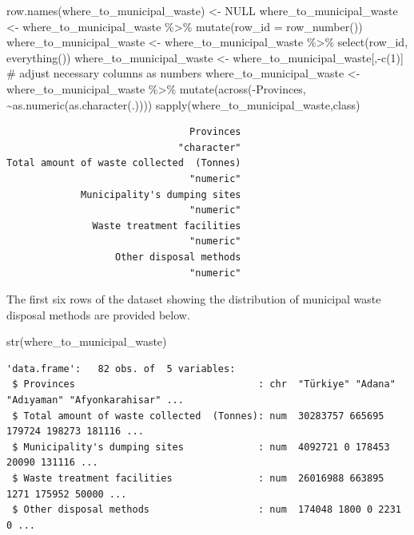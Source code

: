 \documentclass[
  11pt,
  a4paper,
  DIV=11,
  numbers=noendperiod]{scrartcl}
\newenvironment{Shaded}{\begin{snugshade}}{\end{snugshade}}
\newcommand{\AttributeTok}[1]{\textcolor[rgb]{0.40,0.45,0.13}{#1}}
\newcommand{\CommentTok}[1]{\textcolor[rgb]{0.37,0.37,0.37}{#1}}
\newcommand{\ConstantTok}[1]{\textcolor[rgb]{0.56,0.35,0.01}{#1}}
\newcommand{\DecValTok}[1]{\textcolor[rgb]{0.68,0.00,0.00}{#1}}
\newcommand{\FunctionTok}[1]{\textcolor[rgb]{0.28,0.35,0.67}{#1}}
\newcommand{\NormalTok}[1]{\textcolor[rgb]{0.00,0.23,0.31}{#1}}
\newcommand{\OtherTok}[1]{\textcolor[rgb]{0.00,0.23,0.31}{#1}}
\newcommand{\SpecialCharTok}[1]{\textcolor[rgb]{0.37,0.37,0.37}{#1}}
\begin{document}
\begin{Shaded}
\begin{Highlighting}[]
\FunctionTok{row.names}\NormalTok{(where\_to\_municipal\_waste) }\OtherTok{\textless{}{-}} \ConstantTok{NULL}
\NormalTok{where\_to\_municipal\_waste }\OtherTok{\textless{}{-}}\NormalTok{ where\_to\_municipal\_waste }\SpecialCharTok{\%\textgreater{}\%}
  \FunctionTok{mutate}\NormalTok{(}\AttributeTok{row\_id =} \FunctionTok{row\_number}\NormalTok{())  }
\NormalTok{where\_to\_municipal\_waste }\OtherTok{\textless{}{-}}\NormalTok{ where\_to\_municipal\_waste }\SpecialCharTok{\%\textgreater{}\%}
  \FunctionTok{select}\NormalTok{(row\_id, }\FunctionTok{everything}\NormalTok{()) }
\NormalTok{where\_to\_municipal\_waste }\OtherTok{\textless{}{-}}\NormalTok{ where\_to\_municipal\_waste[,}\SpecialCharTok{{-}}\FunctionTok{c}\NormalTok{(}\DecValTok{1}\NormalTok{)]}
\CommentTok{\# adjust necessary columns as numbers}
\NormalTok{where\_to\_municipal\_waste }\OtherTok{\textless{}{-}}\NormalTok{ where\_to\_municipal\_waste }\SpecialCharTok{\%\textgreater{}\%}
  \FunctionTok{mutate}\NormalTok{(}\FunctionTok{across}\NormalTok{(}\SpecialCharTok{{-}}\NormalTok{Provinces, }\SpecialCharTok{\textasciitilde{}}\FunctionTok{as.numeric}\NormalTok{(}\FunctionTok{as.character}\NormalTok{(.))))}
\FunctionTok{sapply}\NormalTok{(where\_to\_municipal\_waste,class)}
\end{Highlighting}
\end{Shaded}

\begin{verbatim}
                                Provinces 
                              "character" 
Total amount of waste collected  (Tonnes) 
                                "numeric" 
             Municipality's dumping sites 
                                "numeric" 
               Waste treatment facilities 
                                "numeric" 
                   Other disposal methods 
                                "numeric" 
\end{verbatim}

The first six rows of the dataset showing the distribution of municipal
waste disposal methods are provided below.

\begin{Shaded}
\begin{Highlighting}[]
\FunctionTok{str}\NormalTok{(where\_to\_municipal\_waste)}
\end{Highlighting}
\end{Shaded}

\begin{verbatim}
'data.frame':   82 obs. of  5 variables:
 $ Provinces                                : chr  "Türkiye" "Adana" "Adıyaman" "Afyonkarahisar" ...
 $ Total amount of waste collected  (Tonnes): num  30283757 665695 179724 198273 181116 ...
 $ Municipality's dumping sites             : num  4092721 0 178453 20090 131116 ...
 $ Waste treatment facilities               : num  26016988 663895 1271 175952 50000 ...
 $ Other disposal methods                   : num  174048 1800 0 2231 0 ...
\end{verbatim}
\end{document}
